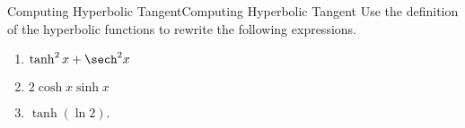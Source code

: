 
\begin{example}{Computing Hyperbolic Tangent}{Computing Hyperbolic Tangent}
 Use the definition of the hyperbolic functions to rewrite the following expressions.
\begin{enumerate}
\item		$\tanh^2 x+\sech^2 x$
\item		$2\cosh x\sinh x$
\item		$\tanh(\ln 2)$.
\end{enumerate}
\end{example} 

